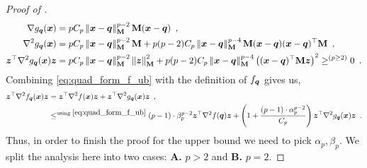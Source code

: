 \begin{proof}[Proof of ]
\begin{align*}
        \nabla g_{\bm{q}}(\bm{x}) &= pC_p\left\lVert \bm{x}-\bm{q} \right\rVert_{\mathbf{M}}^{p-2}{\mathbf{M}}(\bm{x}-\bm{q})\enspace,\\
        \nabla^2 g_{\bm{q}}(\bm{x}) &= pC_p\left\lVert \bm{x}-\bm{q} \right\rVert_{\mathbf{M}}^{p-2}\mathbf{M} + p(p-2)C_p\left\lVert \bm{x}-\bm{q} \right\rVert_{\mathbf{M}}^{p-4}\mathbf{M}(\bm{x}-\bm{q})(\bm{x}-\bm{q})^{\top}\mathbf{M}\enspace,\\
        \bm{z}^{\top}\nabla^2 g_{\bm{q}}(\bm{x})\bm{z} &= pC_p\left\lVert \bm{x}-\bm{q} \right\rVert_{\mathbf{M}}^{p-2}\left\lVert \bm{z} \right\rVert^2_{\mathbf{M}}+ p(p-2)C_p\left\lVert \bm{x}-\bm{q} \right\rVert_{\mathbf{M}}^{p-4}\left((\bm{x}-\bm{q})^{\top}\mathbf{M}\bm{z}\right)^2 \geq^{(p\geq 2)} 0\enspace.
    \end{align*}
    Combining \eqref{eq:quad_form_f_ub} with the definition of $f_{\bm{q}}$ gives us,
    \begin{align*}
        \bm{z}^{\top}\nabla^2f_{\bm{q}}(\bm{x})\bm{z} &= \bm{z}^{\top}\nabla^2f(\bm{x})\bm{z} + \bm{z}^{\top}\nabla^2g_{\bm{q}}(\bm{x})\bm{z}\enspace,\\
        &\leq^{\text{using }\eqref{eq:quad_form_f_ub}} (p-1)\cdot\beta_p^{p-2}\bm{z}^{\top}\nabla^2f(\bm{q})\bm{z} + \left(1+\frac{(p-1)\cdot \alpha_p^{p-2}}{C_p}\right) \bm{z}^{\top}\nabla^2g_{\bm{q}}(\bm{x})\bm{z}\enspace.
    \end{align*}
    Thus, in order to finish the proof for the upper bound we need to pick $\alpha_p, \beta_p$. We split the analysis here into two cases: \textbf{A.} $p>2$ and \textbf{B.} $p=2$.
    

\end{proof}
